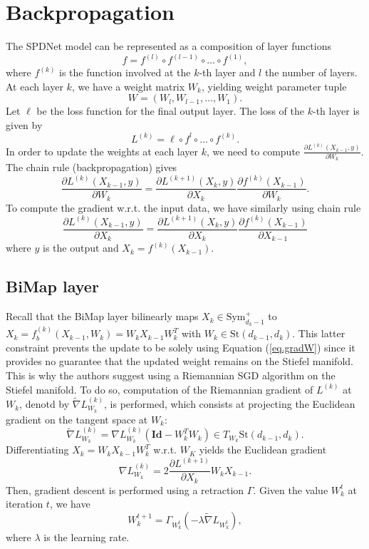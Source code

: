 \documentclass[10pt,a4paper]{book}
\theoremstyle{definition}
\theoremstyle{plain}
\theoremstyle{remark}
\newcommand{\Id}{\mathrm{\textbf{Id}}}
\newcommand \Stif {\textrm{St}}
\begin{document}
\section{Backpropagation}

The SPDNet model can be represented as a composition of layer functions
$$f=f^{(l)}\circ f^{(l-1)}\circ \dots \circ f^{(1)},$$
where $f^{(k)}$ is the function involved at the $k$-th layer and $l$ the number of layers.
At each layer $k$, we have a weight matrix $W_k$, yielding weight parameter tuple 
$$W=(W_l, W_{l-1},\dots,W_1).$$
Let $\ell$ be the loss function for the final output layer. The loss of the $k$-th layer is given by
$$L^{(k)}=\ell \circ f^{l}\circ \dots \circ f^{(k)}.$$
In order to update the weights at each layer $k$, we need to compute $\frac{\partial L^{(k)}(X_{k-1},y)}{\partial W_k}$. The chain rule (backpropagation) gives
\begin{equation}\label{eq.gradW} 
\frac{\partial L^{(k)}(X_{k-1},y)}{\partial W_k}=\frac{\partial L^{(k+1)}(X_{k},y)}{\partial X_k}\frac{\partial f^{(k)}(X_{k-1})}{\partial W_k}.
\end{equation}
To compute the gradient w.r.t. the input data, we have similarly using chain rule
$$
\frac{\partial L^{(k)}(X_{k-1},y)}{\partial X_k}=\frac{\partial L^{(k+1)}(X_{k},y)}{\partial X_k}\frac{\partial f^{(k)}(X_{k-1})}{\partial X_{k-1}}
$$
where $y$ is the output and $X_k=f^{(k)}(X_{k-1})$.
\subsection{BiMap layer}
Recall that the BiMap layer bilinearly maps $X_k \in \text{Sym}_{d_k-1}^{+}$ to $X_k=f_{b}^{(k)}(X_{k-1},W_k)=W_kX_{k-1}W_k^T$ with 
$W_k \in \Stif(d_{k-1},d_k)$. This latter constraint prevents the update to be solely using Equation (\ref{eq.gradW}) since it provides no guarantee that the updated weight remains on the Stiefel manifold.
This is why the authors suggest using a Riemannian SGD algorithm on the Stiefel manifold.
To do so, computation of the Riemannian gradient of $L^{(k)}$ at $W_k$, denotd by $\tilde{\nabla} L^{(k)}_{W_k}$, is performed, which consists at projecting the Euclidean gradient on the tangent space at $W_k$:
$$\tilde{\nabla} L^{(k)}_{W_k}=\nabla L^{(k)}_{W_k}(\Id-W_k^T W_k) \in T_{W_k}\Stif(d_{k-1},d_k).$$
Differentiating $X_k=W_kX_{k-1}W_k^T$ w.r.t. $W_K$ yields the Euclidean gradient
$$\nabla L^{(k)}_{W_k}=2 \frac{\partial L^{(k+1)}}{\partial X_k}W_k X_{k-1}.$$
Then, gradient descent is performed using a retraction $\Gamma$. Given the value $W_k^{t}$ at iteration $t$, we have
$$W_{k}^{t+1}=\Gamma_{W_k^{t}}(-\lambda \tilde{\nabla}L_{W_k^t}),$$
where $\lambda$ is the learning rate.
\end{document}

